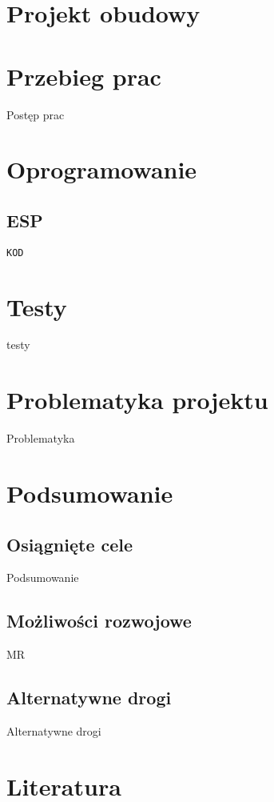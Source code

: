 \documentclass[a4paper, 12pt]{article}
\begin{document}
\newpage
\section{Projekt obudowy}
\hspace{0.6cm}


\newpage
\section{Przebieg prac}
\hspace{0.6cm}Postęp prac

\newpage
\section{Oprogramowanie}
\subsection{ESP}

\hspace{0.6cm}
\begin{lstlisting}[style=CStyle]
KOD
\end{lstlisting}

\section{Testy}
\hspace{0.6cm}testy
\newpage  

\section{Problematyka projektu}
\hspace{0.6cm}
Problematyka


\section{Podsumowanie}
\subsection{Osiągnięte cele}
\hspace{0.6cm}Podsumowanie
\subsection{Możliwości rozwojowe}
\hspace{0.6cm}MR

\subsection{Alternatywne drogi}
\hspace{0.6cm}Alternatywne drogi
\newpage
\section{Literatura}
\end{document}

